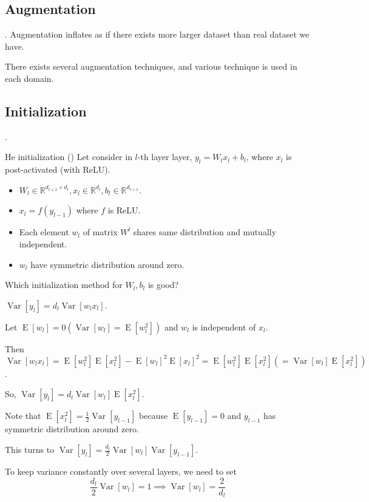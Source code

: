 \documentclass[8pt]{beamer}
\newcommand{\mbb}[1]{\mathbb{#1}}
\newcommand{\expec}[1]{\operatorname{E}\left[ #1 \right]}
\newcommand{\Var}[1]{\operatorname{Var}\left[#1\right]}
\begin{document}
\subsection{Augmentation}

\begin{frame}{.}
    Augmentation inflates as if there exists more larger dataset than real dataset we have.

    There exists several augmentation techniques, and various technique is used in each domain.
\end{frame}

\subsection{Initialization}
\begin{frame}{.}
    \begin{block}{He initialization (\cite{he2015delving})}
        Let consider in $l$-th layer layer, $y_l = W_l x_{l} + b_l$, where $x_l$ is post-activated (with ReLU). 
        \begin{itemize}
            \item $W_l \in \mbb{R}^{d_{l+1} \times d_{l}}, x_l \in \mbb{R}^{d_{l}}, b_l \in \mbb{R}^{d_{l+1}}$.
            \item $x_l = f(y_{l-1})$ where $f$ is ReLU.
            \item Each element $w_l$ of matrix $W^l$ shares same distribution and mutually independent.
            \item $w_l$ have symmetric distribution around zero.
        \end{itemize}
        Which initialization method for $W_l, b_l$ is good?
    \end{block}


    $\Var{y_l} = d_l \Var{w_l x_l}$.

    Let $\expec{w_l} = 0 (\Var{w_l} = \expec{w_l^2})$ and $w_l$ is independent of $x_l$.

    Then $\Var{w_l x_l} = \expec{w_l^2} \expec{x_l^2} - \expec{w_l}^2 \expec{x_l}^2 = \expec{w^2_l} \expec{x^2_l}(=\Var{w_l}\expec{x^2_l})$.

    So, $\Var{y_l} = d_l \Var{w_l}\expec{x^2_l}$.

    Note that $\expec{x_l^2} = \frac{1}{2} \Var{y_{l-1}}$ because $\expec{y_{l-1}} = 0$ and $y_{l-1}$ has symmetric distribution around zero.

    This turns to $\Var{y_l} = \frac{d_l}{2} \Var{w_l} \Var{y_{l-1}}$.

    To keep variance constantly over several layers, we need to set 
    \[\frac{d_l}{2} \Var{w_l} = 1 \implies \Var{w_l} = \frac{2}{d_l}\]
\end{frame}
\end{document}
